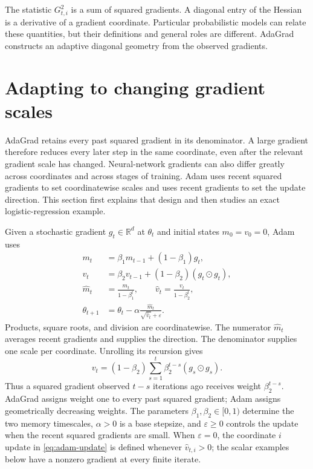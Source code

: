 \documentclass[11pt,twoside]{article}
\newcommand{\R}{\mathbb R}
\theoremstyle{definition}
\theoremstyle{remark}
\begin{document}
The statistic $G_{t,i}^2$ is a sum of squared gradients. A diagonal entry of
the Hessian is a derivative of a gradient coordinate. Particular
probabilistic models can relate these quantities, but their definitions and
general roles are different. AdaGrad constructs an adaptive diagonal geometry
from the observed gradients.

\section{Adapting to changing gradient scales}
\label{sec:adam}

AdaGrad retains every past squared gradient in its denominator. A large
gradient therefore reduces every later step in the same coordinate, even
after the relevant gradient scale has changed. Neural-network gradients can
also differ greatly across coordinates and across stages of training. Adam
uses recent squared gradients to set coordinatewise scales and uses recent
gradients to set the update direction. This section first explains that
design and then studies an exact logistic-regression example.

Given a stochastic gradient $g_t\in\R^d$ at $\theta_t$ and initial states
$m_0=v_0=0$, Adam uses
\begin{align}
 m_t&=\beta_1m_{t-1}+(1-\beta_1)g_t,
 \label{eq:adam-first-moment}\\
 v_t&=\beta_2v_{t-1}+(1-\beta_2)(g_t\odot g_t),
 \label{eq:adam-second-moment}\\
 \widehat m_t&=\frac{m_t}{1-\beta_1^t},
 \qquad
 \widehat v_t=\frac{v_t}{1-\beta_2^t},
 \label{eq:adam-bias-correction}\\
 \theta_{t+1}&=\theta_t-\alpha
 \frac{\widehat m_t}{\sqrt{\widehat v_t}+\varepsilon}.
 \label{eq:adam-update}
\end{align}
Products, square roots, and division are coordinatewise. The numerator
$\widehat m_t$ averages recent gradients and supplies the direction. The
denominator supplies one scale per coordinate. Unrolling its recursion gives
\begin{equation}
 v_t=(1-\beta_2)\sum_{s=1}^t\beta_2^{t-s}(g_s\odot g_s).
 \label{eq:adam-exponential-memory}
\end{equation}
Thus a squared gradient observed $t-s$ iterations ago receives weight
$\beta_2^{t-s}$. AdaGrad assigns weight one to every past squared gradient;
Adam assigns geometrically decreasing weights. The parameters
$\beta_1,\beta_2\in[0,1)$ determine the two memory timescales,
$\alpha>0$ is a base stepsize, and $\varepsilon\ge0$ controls the update when
the recent squared gradients are small. When $\varepsilon=0$, the coordinate
$i$ update in \cref{eq:adam-update} is defined whenever
$\widehat v_{t,i}>0$; the scalar examples below have a nonzero gradient at
every finite iterate.
\end{document}
